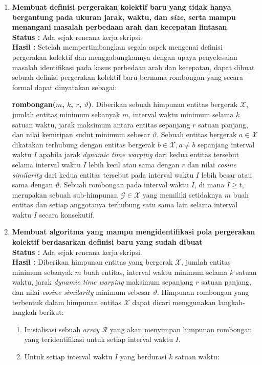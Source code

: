 \documentclass[a4paper,twoside]{article}
\begin{document}
\begin{enumerate}
		\item \textbf{Membuat definisi pergerakan kolektif baru yang tidak hanya bergantung pada ukuran jarak, waktu, dan \textit{size}, serta mampu menangani masalah perbedaan arah dan kecepatan lintasan}\\
		{\bf Status :} Ada sejak rencana kerja skripsi.\\
		{\bf Hasil :} Setelah mempertimbangkan segala aspek mengenai definisi pergerakan kolektif dan menggabungkannya dengan upaya penyelesaian masalah identifikasi pada kasus perbedaan arah dan kecepatan, dapat dibuat sebuah definisi pergerakan kolektif baru bernama rombongan yang secara formal dapat dinyatakan sebagai:
		
		\noindent \textbf{rombongan($m$, $k$, $r$, $\vartheta$)}. Diberikan sebuah himpunan entitas bergerak $\mathcal{X}$, jumlah entitas minimum sebanyak $m$, interval waktu minimum selama $k$ satuan waktu, jarak maksimum antara entitas sepanjang $r$ satuan panjang, dan nilai kemiripan sudut minimum sebesar $\vartheta$. Sebuah entitas bergerak $a \in \mathcal{X}$ dikatakan terhubung dengan entitas bergerak $b \in \mathcal{X}, a \neq b$ sepanjang interval waktu $I$ apabila jarak \textit{dynamic time warping} dari kedua entitas tersebut selama interval waktu $I$ lebih kecil atau sama dengan $r$ dan nilai \textit{cosine similarity} dari kedua entitas tersebut pada interval waktu $I$ lebih besar atau sama dengan $\vartheta$. Sebuah rombongan pada interval waktu $I$, di mana $I \geq t$, merupakan sebuah sub-himpunan $\mathcal{G} \in \mathcal{X}$ yang memiliki setidaknya $m$ buah entitas dan setiap anggotanya terhubung satu sama lain selama interval waktu $I$ secara konsekutif. \\

		\item \textbf{Membuat algoritma yang mampu mengidentifikasi pola pergerakan kolektif berdasarkan definisi baru yang sudah dibuat}\\
		{\bf Status :} Ada sejak rencana kerja skripsi.\\
		{\bf Hasil :} Diberikan himpunan entitas yang bergerak $\mathcal{X}$, jumlah entitas minimum sebanyak $m$ buah entitas, interval waktu minimum selama $k$ satuan waktu, jarak \textit{dynamic time warping} maksimum sepanjang $r$ satuan panjang, dan nilai \textit{cosine similarity} minimum sebesar $\vartheta$. Himpunan rombongan yang terbentuk dalam himpunan entitas $\mathcal{X}$ dapat dicari menggunakan langkah-langkah berikut:
		
		\begin{enumerate}
            \item Inisialisasi sebuah \textit{array} $\mathcal{R}$ yang akan menyimpan himpunan rombongan yang teridentifikasi untuk setiap interval waktu $I$.
            \item Untuk setiap interval waktu $I$ yang berdurasi $k$ satuan waktu:
    

\end{enumerate}
\end{enumerate}
\end{document}
